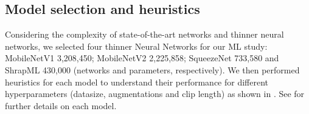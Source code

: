 \documentclass[mlabstract,twocolumn]{jmlr}
\begin{document}
\subsection{Model selection and heuristics}
Considering the complexity of state-of-the-art networks and thinner neural networks, we selected four thinner Neural Networks for our ML study: MobileNetV1 \citep{2017-howared_CoRR_MobileNetV1} 3,208,450; MobileNetV2 \citep{Sandler_2018_CVPR_MobileNetV2} 2,225,858; SqueezeNet \citep{iandola2017squeezenet} 733,580 and ShrapML \citep{boice2022-in-jimaging} 430,000 (networks and parameters, respectively).
We then performed heuristics for each model to understand their performance for different hyperparameters (datasize, augmentations and clip length) as shown in .
See  for further details on each model.
\end{document}

